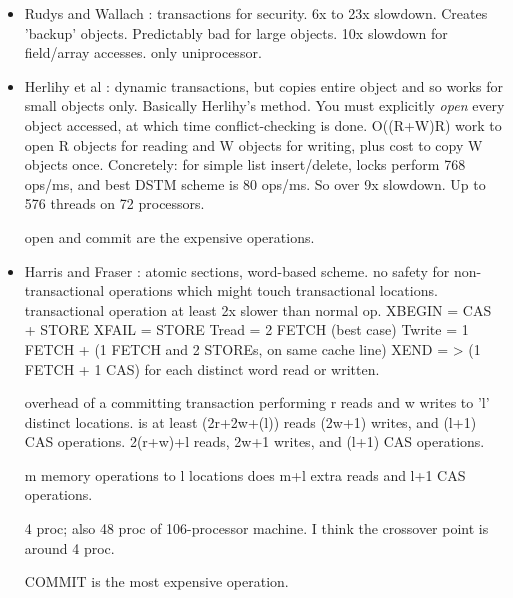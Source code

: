 \documentclass[preprint]{rdbacmconf}
\begin{document}
{\begin{itemize}
  64 processors; no numbers presented for less than 10 processors.

  acquire/release/agree are expensive.

\item Rudys and Wallach \cite{RudysWa02}: transactions for security.
  6x to 23x slowdown.  Creates 'backup' objects.  Predictably bad
  for large objects.  10x slowdown for field/array accesses.
  only uniprocessor.

\item Herlihy et al \cite{HerlihyLuMoSc03}: dynamic transactions, but
  copies entire object and so works for small objects only.  Basically
  Herlihy's method.  You must explicitly \emph{open} every object
  accessed, at which time conflict-checking is done.
  O((R+W)R) work to open R objects for reading and W objects for
  writing, plus cost to copy W objects once.  Concretely: for simple
  list insert/delete, locks perform 768 ops/ms, and best DSTM scheme
  is 80 ops/ms.   So over 9x slowdown.
  Up to 576 threads on 72 processors.

  open and commit are the expensive operations.
\item Harris and Fraser \cite{HarrisFr03}: atomic sections, word-based
  scheme.  no safety for non-transactional operations which might
  touch transactional locations.  transactional operation at least 2x
  slower than normal op.
  XBEGIN = CAS + STORE
  XFAIL = STORE
  Tread = 2 FETCH (best case)
  Twrite = 1 FETCH + (1 FETCH and 2 STOREs, on same cache line)
  XEND = > (1 FETCH + 1 CAS) for each distinct word read or written.

  overhead of a committing transaction performing r reads and w writes
  to 'l' distinct locations.
  is at least (2r+2w+(l)) reads (2w+1) writes, and (l+1) CAS
  operations.  2(r+w)+l reads, 2w+1 writes, and (l+1) CAS operations.

m memory operations to l locations does m+l extra reads and l+1 CAS operations.

  4 proc; also 48 proc of 106-processor machine.  I think the
  crossover point is around 4 proc.

  COMMIT is the most expensive operation.
\end{itemize}
}



\renewcommand{\baselinestretch}{1}



\appendix
{}
\end{document}

